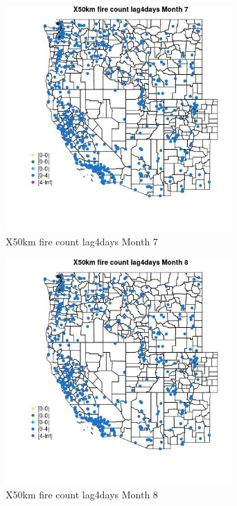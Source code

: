 \begin{figure} 
\centering  
\includegraphics[width=0.77\textwidth]{Code_Outputs/Report_ML_input_PM25_Step4_part_e_de_duplicated_aves_compiled_2019-05-14wNAs_MapObsMo7X50km_fire_count_lag4days.jpg} 
\caption{\label{fig:Report_ML_input_PM25_Step4_part_e_de_duplicated_aves_compiled_2019-05-14wNAsMapObsMo7X50km_fire_count_lag4days}X50km fire count lag4days Month 7} 
\end{figure} 
 

\begin{figure} 
\centering  
\includegraphics[width=0.77\textwidth]{Code_Outputs/Report_ML_input_PM25_Step4_part_e_de_duplicated_aves_compiled_2019-05-14wNAs_MapObsMo8X50km_fire_count_lag4days.jpg} 
\caption{\label{fig:Report_ML_input_PM25_Step4_part_e_de_duplicated_aves_compiled_2019-05-14wNAsMapObsMo8X50km_fire_count_lag4days}X50km fire count lag4days Month 8} 
\end{figure} 
 

